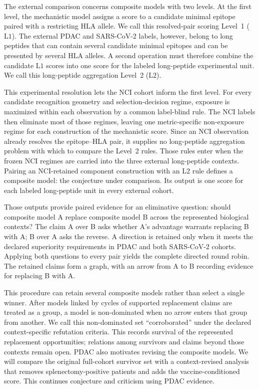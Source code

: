 \documentclass[11pt]{article}
\begin{document}
The external comparison concerns composite models with two levels.
At the first level, the mechanistic model assigns a score to a candidate
minimal epitope paired with a restricting HLA allele. We call this resolved-pair
scoring Level~1 (\(\mathrm{L1}\)). The external PDAC and SARS-CoV-2 labels,
however, belong to long peptides that can contain several candidate minimal
epitopes and can be presented by several HLA alleles. A second operation must
therefore combine the candidate \(\mathrm{L1}\) scores into one score for the
labeled long-peptide experimental unit. We call this long-peptide aggregation
Level~2 (\(\mathrm{L2}\)).

This experimental resolution lets the NCI cohort inform the first level. For
every candidate recognition geometry and selection-decision regime, exposure
is maximized within each observation by a common label-blind rule. The NCI
labels then eliminate most of those regimes, leaving one metric-specific
non-exposure regime for each construction of the mechanistic score. Since an
NCI observation already resolves the epitope--HLA pair, it supplies no
long-peptide aggregation problem with which to compare the Level~2 rules.
Those rules enter when the frozen NCI regimes are carried into the three
external long-peptide contexts. Pairing an NCI-retained component construction
with an L2 rule defines a composite model: the conjecture under comparison. Its
output is one score for each labeled long-peptide unit in every external cohort.

Those outputs provide paired evidence for an eliminative question: should
composite model A replace composite model B across the represented biological
contexts? The claim A over B asks whether A's advantage warrants replacing B
with A; B over A asks the reverse. A direction is retained only when it meets
the declared superiority requirements in PDAC and both SARS-CoV-2 cohorts.
Applying both questions to every pair yields the complete directed round robin.
The retained claims form a graph, with an arrow from A to B recording evidence
for replacing B with A.

This procedure can retain several composite models rather than select a single winner.
After models linked by cycles of supported replacement claims are treated as a
group, a model is non-dominated when no arrow enters that group from another.
We call this non-dominated set ``corroborated'' under the declared
context-specific refutation criteria. This records survival of the represented
replacement opportunities; relations among survivors and claims beyond those
contexts remain open. PDAC also motivates revising the composite models. We
will compare the original full-cohort survivor set with a context-revised
analysis that removes
splenectomy-positive patients and adds the vaccine-conditioned score. This
continues conjecture and criticism using PDAC evidence.
\end{document}
